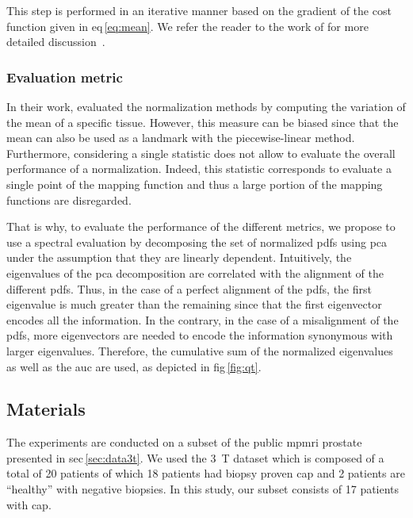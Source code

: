 This step is performed in an iterative manner based on the gradient of the cost function given in \acs{eq}\,\eqref{eq:mean}. 
We refer the reader to the work of \citeauthor{Srivastava2011} for more detailed discussion~\cite{Srivastava2011}.

\subsubsection{Evaluation metric}

In their work, \citeauthor{Nyul2000} evaluated the normalization methods by computing the variation of the mean of a specific tissue.
However, this measure can be biased since that the mean can also be used as a landmark with the piecewise-linear method.
Furthermore, considering a single statistic does not allow to evaluate the overall performance of a normalization.
Indeed, this statistic corresponds to evaluate a single point of the mapping function and thus a large portion of the mapping functions are disregarded. 

That is why, to evaluate the performance of the different metrics, we propose to use a spectral evaluation by decomposing the set of normalized \ac{pdf}s using \ac{pca} under the assumption that they are linearly dependent. 
Intuitively, the eigenvalues of the \ac{pca} decomposition are correlated with the alignment of the different \acp{pdf}.
Thus, in the case of a perfect alignment of the \ac{pdf}s, the first eigenvalue is much greater than the remaining since that the first eigenvector encodes all the information.
In the contrary, in the case of a misalignment of the \ac{pdf}s, more eigenvectors are needed to encode the information synonymous with larger eigenvalues.
Therefore, the cumulative sum of the normalized eigenvalues as well as the \ac{auc} are used, as depicted in \acs{fig}\,\ref{fig:qt}.

\subsection{Materials}\label{subsec:chp5:T2-norm:Exp-res}

The experiments are conducted on a subset of the public \ac{mpmri} prostate presented in \acs{sec}\,\ref{sec:data3t}.
We used the \SI{3}{\tesla} dataset which is composed of a total of 20 patients of which 18 patients had biopsy proven \ac{cap} and 2 patients are ``healthy'' with negative biopsies. 
In this study, our subset consists of 17 patients with \ac{cap}.

